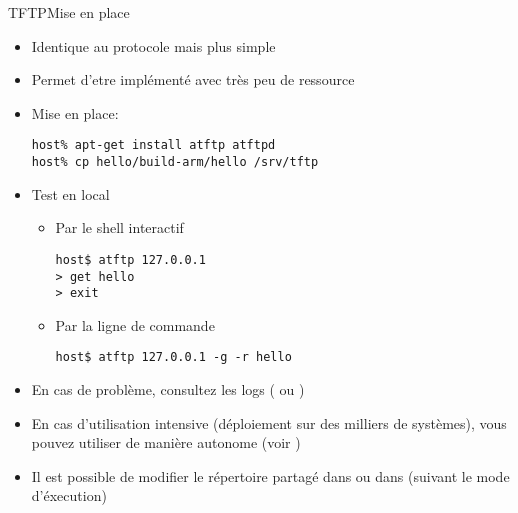 \begin{frame}[fragile=singleslide]{TFTP}{Mise en place}
  \begin{itemize}
  \item Identique au protocole  mais plus simple
  \item Permet d'etre implémenté avec très peu de ressource
  \item Mise en place:
    \begin{lstlisting}
host% apt-get install atftp atftpd
host% cp hello/build-arm/hello /srv/tftp
    \end{lstlisting}
  \item Test en local
    \begin{itemize}
    \item Par le shell interactif
      \begin{lstlisting}
host$ atftp 127.0.0.1
> get hello
> exit
      \end{lstlisting}
    \item Par la ligne de commande
      \begin{lstlisting}
host$ atftp 127.0.0.1 -g -r hello
      \end{lstlisting} %
    \end{itemize}
  \item En cas de  problème, consultez les logs (
    ou )
  \item En  cas d'utilisation intensive (déploiement  sur des milliers
    de  systèmes),  vous   pouvez  utiliser    de  manière
    autonome (voir )
  \item  Il  est  possible  de  modifier le  répertoire  partagé  dans
     ou dans  (suivant
    le mode d'éxecution)
  \end{itemize}
\end{frame}  

